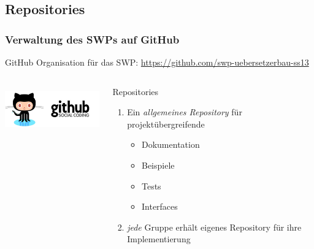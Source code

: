 \documentclass[ucs,9pt]{beamer}
\begin{document}
\subsection{Repositories}
\begin{frame}
    \frametitle{Verwaltung des SWPs auf GitHub}
    GitHub Organisation für das SWP:
    \url{https://github.com/swp-uebersetzerbau-ss13}
  \begin{columns}
    \begin{column}{0.5\textwidth}
  \begin{center}
    \includegraphics[height=2cm]{githuboctacat}
  \end{center}
\end{column}
    \begin{column}{0.5\textwidth}
  \begin{block}{Repositories}
      \begin{enumerate}
          \item Ein \emph{allgemeines Repository} für projektübergreifende
              \begin{itemize}
                  \item Dokumentation
                  \item Beispiele
                  \item Tests
                  \item Interfaces
              \end{itemize}
          \item \emph{jede} Gruppe erhält eigenes Repository für ihre
              Implementierung
      \end{enumerate}
  \end{block}
\end{column}
  \end{columns}
\end{frame}
\end{document}

